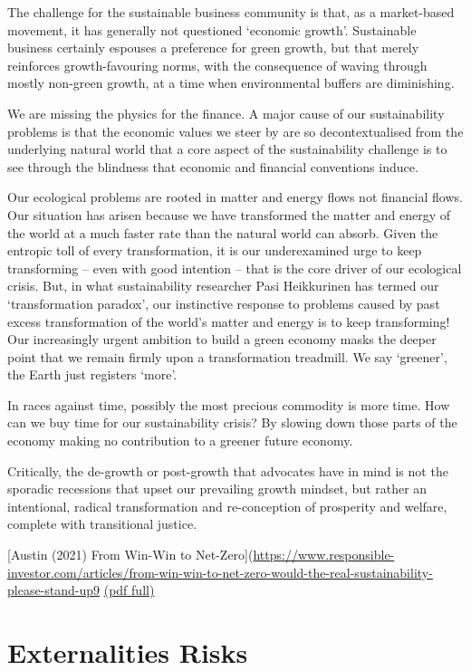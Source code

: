\documentclass[
]{book}
\begin{document}
The challenge for the sustainable business community is that, as a market-based movement, it has generally not questioned `economic growth'. Sustainable business certainly espouses a preference for green growth, but that merely reinforces growth-favouring norms, with the consequence of waving through mostly non-green growth, at a time when environmental buffers are diminishing.

We are missing the physics for the finance. A major cause of our sustainability problems is that the economic values we steer by are so decontextualised from the underlying natural world that a core aspect of the sustainability challenge is to see through the blindness that economic and financial conventions induce.

Our ecological problems are rooted in matter and energy flows not financial flows. Our situation has arisen because we have transformed the matter and energy of the world at a much faster rate than the natural world can absorb. Given the entropic toll of every transformation, it is our underexamined urge to keep transforming -- even with good intention -- that is the core driver of our ecological crisis. But, in what sustainability researcher Pasi Heikkurinen has termed our `transformation paradox', our instinctive response to problems caused by past excess transformation of the world's matter and energy is to keep transforming! Our increasingly urgent ambition to build a green economy masks the deeper point that we remain firmly upon a transformation treadmill. We say `greener', the Earth just registers `more'.

In races against time, possibly the most precious commodity is more time. How can we buy time for our sustainability crisis? By slowing down those parts of the economy making no contribution to a greener future economy.

Critically, the de-growth or post-growth that advocates have in mind is not the sporadic recessions that upset our prevailing growth mindset, but rather an intentional, radical transformation and re-conception of prosperity and welfare, complete with transitional justice.

{[}Austin (2021) From Win-Win to Net-Zero{]}(\url{https://www.responsible-investor.com/articles/from-win-win-to-net-zero-would-the-real-sustainability-please-stand-up9}
\href{pdf/Austin_2021_Win-Win_Net-Zero.pdf}{(pdf full)}

\hypertarget{externalities-risks}{%
\section{Externalities Risks}\label{externalities-risks}}
\end{document}
